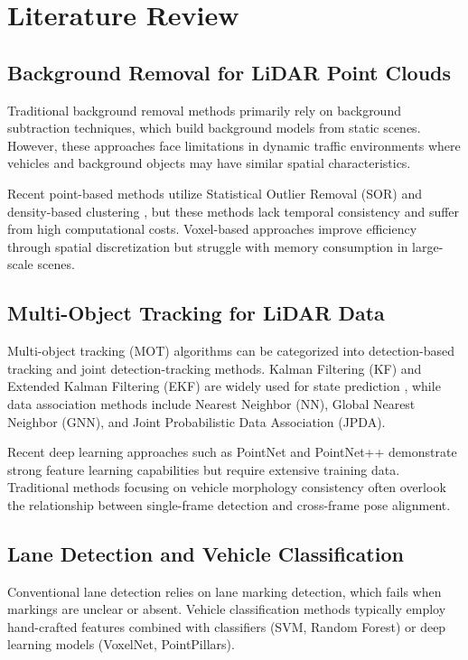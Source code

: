 \documentclass[numbered]{trbunofficial}
\begin{document}
\section{Literature Review}

\subsection{Background Removal for LiDAR Point Clouds}

Traditional background removal methods primarily rely on background subtraction techniques, which build background models from static scenes. However, these approaches face limitations in dynamic traffic environments where vehicles and background objects may have similar spatial characteristics.

Recent point-based methods utilize Statistical Outlier Removal (SOR) and density-based clustering \cite{meyer2001}, but these methods lack temporal consistency and suffer from high computational costs. Voxel-based approaches \cite{Bierlaire2003} improve efficiency through spatial discretization but struggle with memory consumption in large-scale scenes.

\subsection{Multi-Object Tracking for LiDAR Data}

Multi-object tracking (MOT) algorithms can be categorized into detection-based tracking and joint detection-tracking methods. Kalman Filtering (KF) and Extended Kalman Filtering (EKF) are widely used for state prediction \cite{Garrow2009}, while data association methods include Nearest Neighbor (NN), Global Nearest Neighbor (GNN), and Joint Probabilistic Data Association (JPDA).

Recent deep learning approaches such as PointNet and PointNet++ \cite{Koppelman2005} demonstrate strong feature learning capabilities but require extensive training data. Traditional methods focusing on vehicle morphology consistency often overlook the relationship between single-frame detection and cross-frame pose alignment.

\subsection{Lane Detection and Vehicle Classification}

Conventional lane detection relies on lane marking detection, which fails when markings are unclear or absent. Vehicle classification methods typically employ hand-crafted features combined with classifiers (SVM, Random Forest) or deep learning models (VoxelNet, PointPillars).
\end{document}
